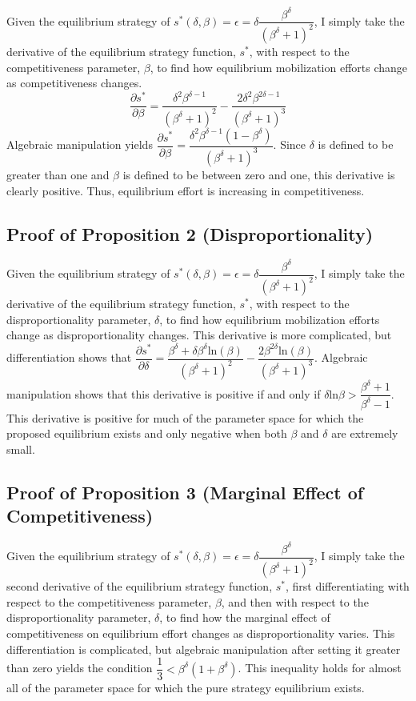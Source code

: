 \documentclass[12pt]{article}
\begin{document}
\begin{appendix}
Given the equilibrium strategy of $s^*(\delta, \beta) = \epsilon = \delta\dfrac{\beta^\delta}{(\beta^\delta + 1)^2}$, I simply take the derivative of the equilibrium strategy function, $s^*$, with respect to the competitiveness parameter, $\beta$, to find how equilibrium mobilization efforts change as competitiveness changes.
\begin{equation}
\dfrac{\partial s^*}{\partial \beta} = \dfrac{\delta^2\beta^{\delta - 1}}{(\beta^\delta + 1)^2} - \dfrac{2\delta^2\beta^{2\delta - 1}}{(\beta^\delta + 1)^3}
\end{equation}
Algebraic manipulation yields $\dfrac{\partial s^*}{\partial \beta} = \dfrac{\delta^2\beta^{\delta - 1}(1 - \beta^\delta)}{(\beta^\delta + 1)^3}$. Since $\delta$ is defined to be greater than one and $\beta$ is defined to be between zero and one, this derivative is clearly positive. Thus, equilibrium effort is increasing in competitiveness.

\subsection{Proof of Proposition 2 (Disproportionality)}

Given the equilibrium strategy of $s^*(\delta, \beta) = \epsilon = \delta\dfrac{\beta^\delta}{(\beta^\delta + 1)^2}$, I simply take the derivative of the equilibrium strategy function, $s^*$, with respect to the disproportionality parameter, $\delta$, to find how equilibrium mobilization efforts change as disproportionality changes. This derivative is more complicated, but differentiation shows that $\dfrac{\partial s^*}{\partial \delta} = \dfrac{\beta^\delta + \delta\beta^\delta \text{ln}(\beta)}{(\beta^\delta + 1)^2} - \dfrac{2\beta^{2\delta}\text{ln}(\beta)}{(\beta^\delta + 1)^3}$. Algebraic manipulation shows that this derivative is positive if and only if $\delta\text{ln}{\beta} > \dfrac{\beta^\delta + 1}{\beta^\delta - 1}$. This derivative is positive for much of the parameter space for which the proposed equilibrium exists and only negative when both $\beta$ and $\delta$ are extremely small.

\subsection{Proof of Proposition 3 (Marginal Effect of Competitiveness)}

Given the equilibrium strategy of $s^*(\delta, \beta) = \epsilon = \delta\dfrac{\beta^\delta}{(\beta^\delta + 1)^2}$, I simply take the second derivative of the equilibrium strategy function, $s^*$, first differentiating with respect to the competitiveness parameter, $\beta$, and then with respect to the disproportionality parameter, $\delta$, to find how the marginal effect of competitiveness on equilibrium effort changes as disproportionality varies. This differentiation is complicated, but algebraic manipulation after setting it greater than zero yields the condition $\dfrac{1}{3} < \beta^\delta(1 + \beta^\delta)$. This inequality holds for almost all of the parameter space for which the pure strategy equilibrium exists.


\end{appendix}
\end{document}
